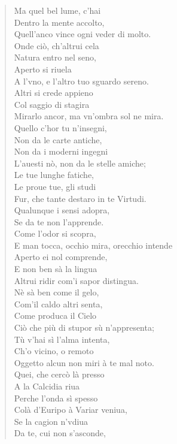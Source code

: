 \documentclass[11pt,twoside,openany]{book}
\begin{document}
\begin{verse}
Ma quel bel lume, c'hai \\
Dentro la mente accolto, \\
Quell'anco vince ogni veder di molto. \\[0.8em]
Onde ciò, ch'altrui cela \\
Natura entro nel seno, \\
Aperto si riuela \\
A l'vno, e l'altro tuo sguardo sereno. \\
Altri si crede appieno \\
Col saggio di stagira \\
Mirarlo ancor, ma vn'ombra sol ne mira. \\[0.8em]
Quello c'hor tu n'insegni, \\
Non da le carte antiche, \\
Non da i moderni ingegni \\
L'auesti nò, non da le stelle amiche; \\
Le tue lunghe fatiche, \\
Le proue tue, gli studi \\
Fur, che tante destaro in te Virtudi. \\[0.8em]
Qualunque i sensi adopra, \\
Se da te non l'apprende. \\
Come l'odor si scopra, \\
E man tocca, occhio mira, orecchio intende \\
Aperto ei nol comprende, \\
E non ben sà la lingua \\
Altrui ridir com'i sapor distingua. \\[0.8em]
Nè sà ben come il gelo, \\
Com'il caldo altri senta, \\
Come produca il Cielo \\
Ciò che più di stupor sù n'appresenta; \\
Tù v'hai sì l'alma intenta, \\
Ch'o vicino, o remoto \\
Oggetto alcun non miri à te mal noto. \\[0.8em]
Quei, che cercò là presso \\
A la Calcidia riua \\
Perche l'onda sì spesso \\
Colà d'Euripo à Variar veniua, \\
Se la cagion n'vdiua \\
Da te, cui non s'asconde, \\

\end{verse}
\end{document}
